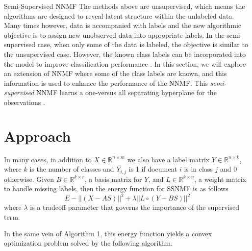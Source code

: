 \documentclass[12pt]{pom_thesis}
\begin{document}
\begin{chapter}{Semi-Supervised NNMF}
	The methods above are unsupervised, which means the algorithms are designed to reveal latent structure within the unlabeled data. Many times however, data is accompanied with labels and the new algorithmic objective is to assign new unobserved data into appropriate labels. In the semi-supervised case, when only some of the data is labeled, the objective is similar to the unsupervised case. However, the known class labels can be incorporated into the model to improve classification performance \cite{lee2010semi}. In this section, we will explore an extension of NNMF where some of the class labels are known, and this information is used to enhance the performance of the NNMF. This \emph{semi-supervised} NNMF  learns a one-versus all separating hyperplane for the observations \cite{lee2010semi}.
	\section{Approach}
	In many cases, in addition to  $X \in \mathbb{R}^{n\times m}$ we also have a label matrix $Y \in \mathbb{R}^{n\times k}$, where $k$ is the number of classes and $Y_{i,j}$ is 1 if document $i$ is in class $j$ and 0 otherwise. 
	Given $B \in \mathbb{R}^{k \times r}$, a basis matrix for $Y$, and $L \in \mathbb{R}^{k \times n}$, a weight matrix to handle missing labels, then the energy function for SSNMF is as follows
	$$E - ||(X-AS)||^2 + \lambda ||L \circ (Y-BS)||^2$$
	where $\lambda$ is a tradeoff parameter that governs the importance of the supervised term.
	
	In the same vein of Algorithm 1, this energy function yields a convex optimization problem solved by the following algorithm. 
	
	\begin{algorithm}[H]
		\caption{Multiplicative Update for Semi-Supervised NNMF}
	\end{algorithm}

\end{chapter}
\end{document}
